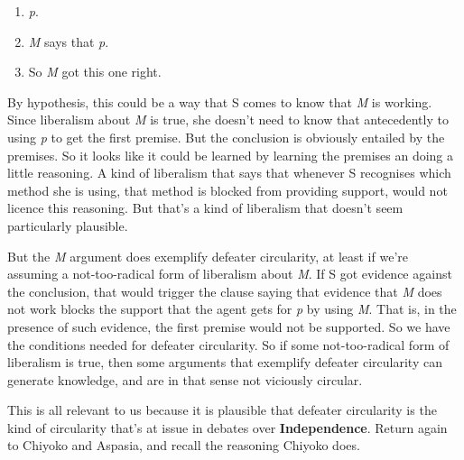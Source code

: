 \begin{enumerate}
\item{} \emph{p}.

\item{} \emph{M} says that \emph{p}.

\item{} So \emph{M} got this one right.

\end{enumerate}
By hypothesis, this could be a way that S comes to know that \emph{M} is working. Since liberalism about \emph{M} is true, she doesn't need to know that antecedently to using \emph{p} to get the first premise. But the conclusion is obviously entailed by the premises. So it looks like it could be learned by learning the premises an doing a little reasoning. A kind of liberalism that says that whenever S recognises which method she is using, that method is blocked from providing support, would not licence this reasoning. But that's a kind of liberalism that doesn't seem particularly plausible.

But the \emph{M} argument does exemplify defeater circularity, at least if we're assuming a not-too-radical form of liberalism about \emph{M}. If S got evidence against the conclusion, that would trigger the clause saying that evidence that \emph{M} does not work blocks the support that the agent gets for \emph{p} by using \emph{M}. That is, in the presence of such evidence, the first premise would not be supported. So we have the conditions needed for defeater circularity. So if some not-too-radical form of liberalism is true, then some arguments that exemplify defeater circularity can generate knowledge, and are in that sense not viciously circular.

This is all relevant to us because it is plausible that defeater circularity is the kind of circularity that's at issue in debates over \textbf{Independence}. Return again to \gls{Chiyoko} and \gls{Aspasia}, and recall the reasoning \gls{Chiyoko} does.

